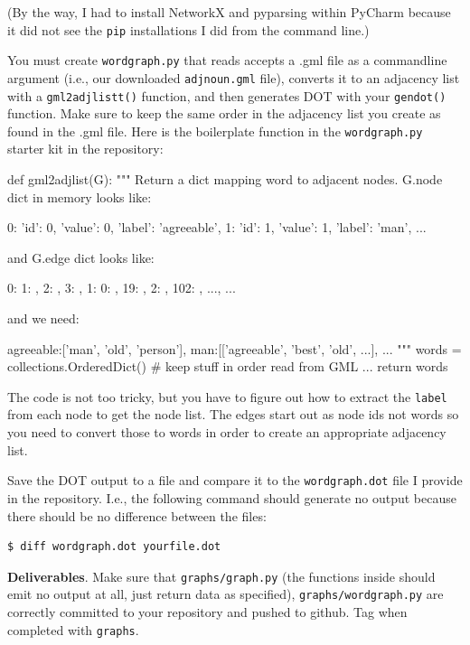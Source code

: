 \begin{fullwidth}
(By the way, I had to install NetworkX and pyparsing within PyCharm because it did not see the {\tt pip} installations I did from the command line.)

You must create {\tt wordgraph.py} that reads accepts a .gml file as a commandline argument (i.e., our downloaded {\tt adjnoun.gml} file), converts it to an adjacency list with a {\tt gml2adjlistt()} function, and then generates DOT with your {\tt gendot()} function. Make sure to keep the same order in the adjacency list you create as found in the .gml file.  Here is the boilerplate function in the {\tt wordgraph.py} starter kit in the repository:

\begin{pyverbatim}
def gml2adjlist(G):
    """
    Return a dict mapping word to adjacent nodes. G.node dict in memory
    looks like:

    {0: {'id': 0, 'value': 0, 'label': 'agreeable'},
    1: {'id': 1, 'value': 1, 'label': 'man'}, ... }

    and G.edge dict looks like:

    {0: {1: {}, 2: {}, 3: {}}, 1: {0: {}, 19: {}, 2: {}, 102: {}, ...}, ...}

    and we need:

    {agreeable:['man', 'old', 'person'], man:[['agreeable', 'best', 'old', ...], ...}
    """
    words = collections.OrderedDict()  # keep stuff in order read from GML
    ...
    return words
\end{pyverbatim}

The code is not too tricky, but you have to figure out how to extract the {\tt label} from each node to get the node list. The edges start out as node ids not words so you need to convert those to words in order to create an appropriate adjacency list.

Save the DOT output to a file and compare it to the {\tt wordgraph.dot} file I provide in the repository. I.e., the following command should generate no output because there should be no difference between the files:

\begin{lstlisting}[style=BashInputStyle]
$ diff wordgraph.dot yourfile.dot
\end{lstlisting}

\begin{callout}{\bcplume}
{\bf Deliverables}. Make sure that {\tt graphs/graph.py} (the functions inside should emit no output at all, just return data as specified), {\tt graphs/wordgraph.py} are correctly committed to your repository and pushed to github. Tag when completed with {\tt graphs}.
\end{callout}

\end{fullwidth}
